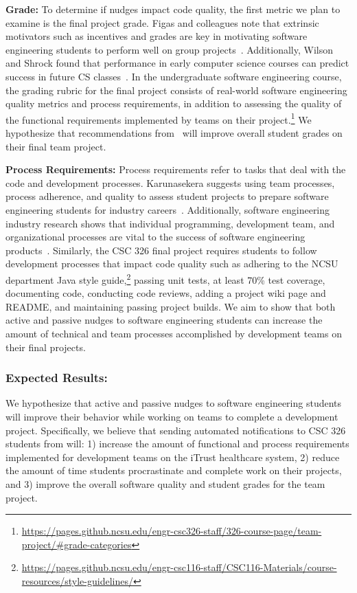 \textbf{Grade:} To determine if nudges impact code quality, the first metric we plan to examine is the final project grade. Figas and colleagues note that extrinsic motivators such as incentives and grades are key in motivating software engineering students to perform well on group projects~\cite{figas2013furtherance}. Additionally, Wilson and Shrock found that performance in early computer science courses can predict success in future CS classes~\cite{wilson2001contributing}. In the undergraduate software engineering course, the grading rubric for the final project consists of real-world software engineering quality metrics and process requirements, in addition to assessing the quality of the functional requirements implemented by teams on their project.\footnote{\url{https://pages.github.ncsu.edu/engr-csc326-staff/326-course-page/team-project/\#grade-categories}} We hypothesize that recommendations from \TOOL~will improve overall student grades on their final team project.

\textbf{Process Requirements:} Process requirements refer to tasks that deal with the code and development processes. Karunasekera suggests using team processes, process adherence, and quality to assess student projects to prepare software engineering students for industry careers~\cite{karunasekera2007preparing}. Additionally, software engineering industry research shows that individual programming, development team, and organizational processes are vital to the success of software engineering products~\cite{crowston2004effective}. Similarly, the CSC 326 final project requires students to follow development processes that impact code quality such as adhering to the NCSU department Java style guide,\footnote{\url{https://pages.github.ncsu.edu/engr-csc116-staff/CSC116-Materials/course-resources/style-guidelines/}} passing unit tests, at least 70\% test coverage, documenting code, conducting code reviews, adding a project wiki page and README, and maintaining passing project builds. We aim to show that both active and passive nudges to software engineering students can increase the amount of technical and team processes accomplished by development teams on their final projects.

\subsubsection{Expected Results:}

We hypothesize that active and passive nudges to software engineering students will improve their behavior while working on teams to complete a development project. Specifically, we believe that sending automated notifications to CSC 326 students from \TOOL will: 1) increase the amount of functional and process requirements implemented for development teams on the iTrust healthcare system, 2) reduce the amount of time students procrastinate and complete work on their projects, and 3) improve the overall software quality and student grades for the team project.

\newpage